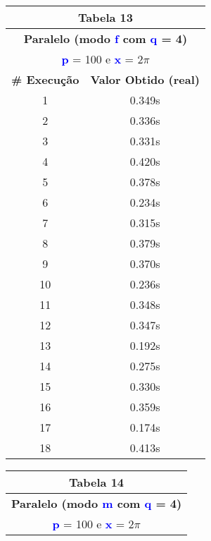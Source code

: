 \documentclass[11pt]{article}
\begin{document}
\begin{table}[!h]
	\begin{center}
		\begin{minipage}{0.48\textwidth}
			\begin{tabular}{| c | c |}
			\hline
			\multicolumn{2}{|c|}{\textbf{Tabela 13}} \\ \hline
			\multicolumn{2}{|c|}{\textbf{Paralelo (modo \textbf{\textcolor{blue}{f}} com \textbf{\textcolor{blue}{q}} = 4)}} \\
			\multicolumn{2}{|c|}{\textbf{\textcolor{blue}{p}} = 100 e \textbf{\textcolor{blue}{x}} = $2\pi$} \\ [0.2ex]
			\hline
				\textbf{\# Execução} &  \textbf{Valor Obtido (real)} \\ \hline
				1 & 0.349s \\ \hline
				2 & 0.336s \\ \hline
				3 & 0.331s \\ \hline
				4 & 0.420s \\ \hline
				5 & 0.378s \\ \hline
				6 & 0.234s \\ \hline
				7 & 0.315s \\ \hline
				8 & 0.379s \\ \hline
				9 & 0.370s \\ \hline
				10 & 0.236s \\ \hline
				11 & 0.348s \\ \hline
				12 & 0.347s \\ \hline
				13 & 0.192s \\ \hline
				14 & 0.275s \\ \hline
				15 & 0.330s \\ \hline
				16 & 0.359s \\ \hline
				17 & 0.174s \\ \hline
				18 & 0.413s \\ \hline
			\end{tabular}
		\end{minipage}
		\begin{minipage}{0.48\textwidth}
			\begin{tabular}{| c | c |}
			\hline
			\multicolumn{2}{|c|}{\textbf{Tabela 14}} \\ \hline
			\multicolumn{2}{|c|}{\textbf{Paralelo (modo \textbf{\textcolor{blue}{m}} com \textbf{\textcolor{blue}{q}} = 4)}} \\
			\multicolumn{2}{|c|}{\textbf{\textcolor{blue}{p}} = 100 e \textbf{\textcolor{blue}{x}} = $2\pi$} \\ [0.2ex]

\end{tabular}
\end{minipage}
\end{center}
\end{table}
\end{document}
